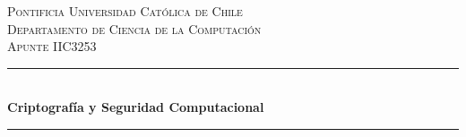 \documentclass[letterpaper]{article}
\begin{document}

\begin{titlepage} %
    \newcommand{\HRule}{\rule{\linewidth}{0.5mm}} %

    \center %


    \textsc{\LARGE Pontificia Universidad Católica de Chile}\\[1.5cm] %

    \textsc{\Large Departamento de Ciencia de la Computación}\\[0.5cm] %

    \textsc{\large Apunte IIC3253}\\[0.5cm] %


    \HRule\\[0.5cm]

    {\huge\bfseries Criptografía y Seguridad Computacional}\\[0.4cm] %

    \HRule\\[1.5cm]



\end{titlepage}
\end{document}
